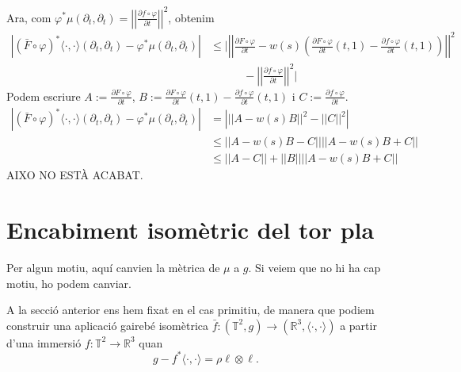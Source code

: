 {Ara, com $\varphi^*\mu(\partial_t,\partial_t) = \left|\left| \frac{\partial f\circ\varphi}{\partial t} \right|\right|^2$, obtenim
\begin{align*}
    |(\bar F\circ\varphi)^*\langle\cdot,\cdot\rangle(\partial_t, \partial_t) - \varphi^*\mu(\partial_t, \partial_t)| &\le 
    \Bigg|\left|\left|\frac{\partial F\circ\varphi}{\partial t}-w(s)\left(\frac{\partial F\circ\varphi}{\partial t}(t,1) - \frac{\partial f\circ\varphi}{\partial t}(t,1)\right)\right|\right|^2 \\&\quad\quad\quad- \left|\left| \frac{\partial f\circ\varphi}{\partial t} \right|\right|^2\Bigg|
\end{align*}
Podem escriure $A:=\frac{\partial F\circ\varphi}{\partial t}$, $B:=\frac{\partial F\circ \varphi}{\partial t}(t,1) - \frac{\partial f\circ\varphi}{\partial t}(t,1)$ i $C:=\frac{\partial f\circ\varphi}{\partial t}$.
\begin{align*}
    |(\bar F\circ\varphi)^*\langle\cdot,\cdot\rangle(\partial_t, \partial_t) - \varphi^*\mu(\partial_t, \partial_t)| 
    &=
    \left|\left|\left|A-w(s)B\right|\right|^2 - \left|\left|C\right|\right|^2\right|
    \\&\le
    \left|\left|A-w(s)B - C\right|\right|\left|\left|A-w(s)B + C\right|\right|
    \\&\le
    \left|\left|A - C\right|\right| + \left|\left|B\right|\right| \left|\left|A-w(s)B + C\right|\right|
\end{align*}
{\color{red} AIXO NO ESTÀ ACABAT.}








}









\section{Encabiment isomètric del tor pla}
{
\color{blue} Per algun motiu, aquí canvien la mètrica de $\mu$ a $g$. Si veiem que no hi ha cap motiu, ho podem canviar.
}

A la secció anterior ens hem fixat en el cas primitiu, de manera que podiem construir una aplicació gairebé isomètrica $\bar f:(\mathbb T^2, g)\to(\mathbb R^3, \langle\cdot, \cdot\rangle)$ a partir d'una immersió $f:\mathbb T^2\to\mathbb R^3$ quan
\begin{equation*}
    g - f^*\langle\cdot, \cdot\rangle = \rho\ell\otimes\ell.
\end{equation*}

